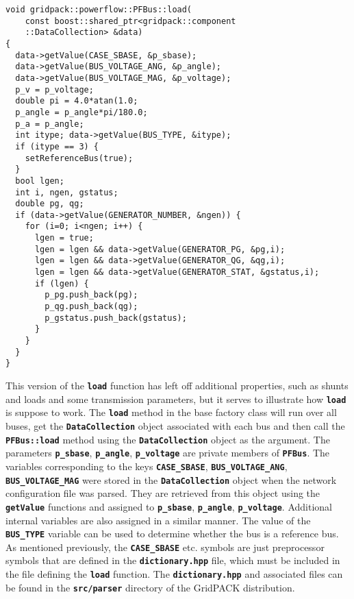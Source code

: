 {
\color{red}
\begin{Verbatim}[fontseries=b]
void gridpack::powerflow::PFBus::load(
    const boost::shared_ptr<gridpack::component
    ::DataCollection> &data)
{
  data->getValue(CASE_SBASE, &p_sbase);
  data->getValue(BUS_VOLTAGE_ANG, &p_angle);
  data->getValue(BUS_VOLTAGE_MAG, &p_voltage);
  p_v = p_voltage;
  double pi = 4.0*atan(1.0;
  p_angle = p_angle*pi/180.0;
  p_a = p_angle;
  int itype; data->getValue(BUS_TYPE, &itype);
  if (itype == 3) {
    setReferenceBus(true);
  }
  bool lgen;
  int i, ngen, gstatus;
  double pg, qg;
  if (data->getValue(GENERATOR_NUMBER, &ngen)) {
    for (i=0; i<ngen; i++) {
      lgen = true;
      lgen = lgen && data->getValue(GENERATOR_PG, &pg,i);
      lgen = lgen && data->getValue(GENERATOR_QG, &qg,i);
      lgen = lgen && data->getValue(GENERATOR_STAT, &gstatus,i);
      if (lgen) {
        p_pg.push_back(pg);
        p_qg.push_back(qg);
        p_gstatus.push_back(gstatus);
      }
    }
  }
}
\end{Verbatim}
}

This version of the \texttt{\textbf{load}} function has left off additional
properties, such as shunts and loads and some transmission parameters, but it
serves to illustrate how \texttt{\textbf{load}} is suppose to work. The
\texttt{\textbf{load}} method in the base factory class will run over all buses,
get the \texttt{\textbf{DataCollection}} object associated with each bus and
then call the \texttt{\textbf{PFBus::load}} method using the
\texttt{\textbf{DataCollection}} object as the argument. The parameters
\texttt{\textbf{p\_sbase}}, \texttt{\textbf{p\_angle}},
\texttt{\textbf{p\_voltage}} are private members of \texttt{\textbf{PFBus}}. The
variables corresponding to the keys \texttt{\textbf{CASE\_SBASE}},
\texttt{\textbf{BUS\_VOLTAGE\_ANG}}, \texttt{\textbf{BUS\_VOLTAGE\_MAG}} were
stored in the \texttt{\textbf{DataCollection}} object when the network
configuration file was parsed. They are retrieved from this object using the
\texttt{\textbf{getValue}} functions and assigned to \texttt{\textbf{p\_sbase}},
\texttt{\textbf{p\_angle}}, \texttt{\textbf{p\_voltage}}. Additional internal
variables are also assigned in a similar manner. The value of the
\texttt{\textbf{BUS\_TYPE}} variable can be used to determine whether the bus is
a reference bus. As mentioned previously, the \texttt{\textbf{CASE\_SBASE}} etc.
symbols are just preprocessor symbols that are defined in the
\texttt{\textbf{dictionary.hpp}} file, which must be included in the file
defining the \texttt{\textbf{load}} function. The
\texttt{\textbf{dictionary.hpp}} and associated files can be found in the \texttt{\textbf{src/parser}} directory of the GridPACK distribution.

